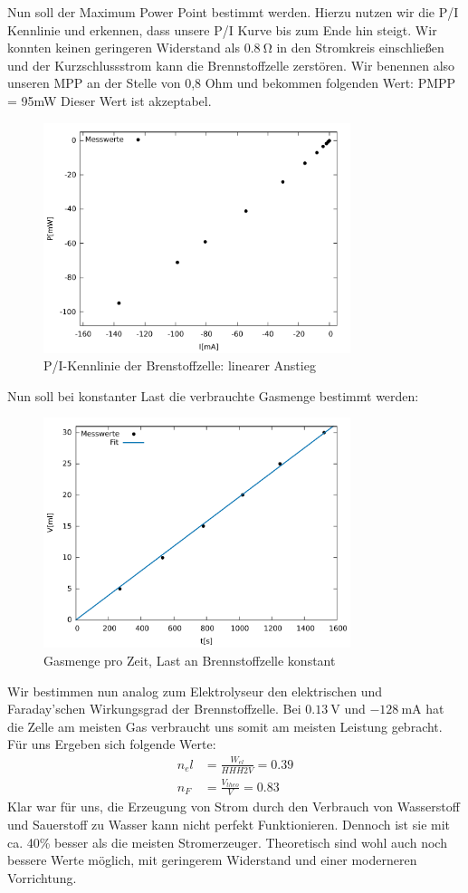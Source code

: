 Nun soll der Maximum Power Point bestimmt werden. Hierzu nutzen wir die P/I Kennlinie und erkennen, dass unsere P/I Kurve bis zum Ende hin steigt. Wir konnten keinen geringeren Widerstand als $\SI{0,8}{\ohm}$  in den Stromkreis einschließen und der Kurzschlussstrom kann die Brennstoffzelle zerstören.
Wir benennen also unseren MPP an der Stelle von 0,8 Ohm und bekommen folgenden Wert: PMPP = 95mW 
Dieser Wert ist akzeptabel.
\begin{figure}[htbp]
	\centering
	\includegraphics[width=0.8\textwidth]{mess/aufg11.pdf}
	\caption{P/I-Kennlinie der Brenstoffzelle: linearer Anstieg}
	\label{a11}
\end{figure}

Nun soll bei konstanter Last die verbrauchte Gasmenge bestimmt werden:
\begin{figure}[htbp]
	\centering
	\includegraphics[width=0.8\textwidth]{mess/aufg12.pdf}
	\caption{Gasmenge pro Zeit, Last an Brennstoffzelle konstant}
	\label{a12}
\end{figure}
Wir bestimmen nun analog zum Elektrolyseur den elektrischen und Faraday’schen Wirkungsgrad der Brennstoffzelle.
Bei $\SI{0.13}{\volt}$ und $\SI{-128}{\milli \ampere}$ hat die Zelle am meisten Gas verbraucht uns somit am meisten Leistung gebracht. Für uns Ergeben sich folgende Werte:
\begin{align*}
n_el &= \frac{W_{el}}{HHH2V}=0.39 \\
n_F &= \frac{V_{theo}}{V}=0.83
\end{align*}
Klar war für uns, die Erzeugung von Strom durch den Verbrauch von Wasserstoff und Sauerstoff zu Wasser kann nicht perfekt Funktionieren.
Dennoch ist sie mit ca. 40\% besser als die meisten Stromerzeuger.
Theoretisch sind wohl auch noch bessere Werte möglich, mit geringerem Widerstand und einer moderneren Vorrichtung.
